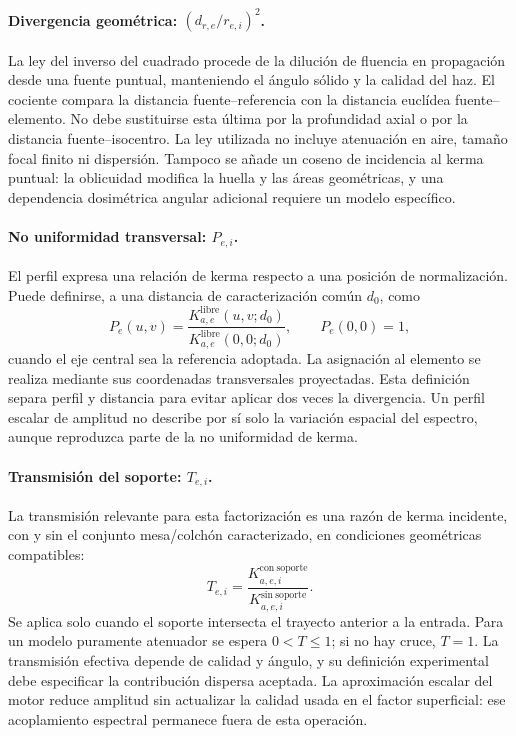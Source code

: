 \paragraph{Divergencia geométrica: $(d_{r,e}/r_{e,i})^2$.}
La ley del inverso del cuadrado procede de la dilución de fluencia en propagación desde una fuente puntual, manteniendo el ángulo sólido y la calidad del haz. El cociente compara la distancia fuente--referencia con la distancia euclídea fuente--elemento. No debe sustituirse esta última por la profundidad axial o por la distancia fuente--isocentro. La ley utilizada no incluye atenuación en aire, tamaño focal finito ni dispersión. Tampoco se añade un coseno de incidencia al kerma puntual: la oblicuidad modifica la huella y las áreas geométricas, y una dependencia dosimétrica angular adicional requiere un modelo específico.

\paragraph{No uniformidad transversal: $P_{e,i}$.}
El perfil expresa una relación de kerma respecto a una posición de normalización. Puede definirse, a una distancia de caracterización común $d_0$, como
\begin{equation}
P_e(u,v)=\frac{K^{\mathrm{libre}}_{a,e}(u,v;d_0)}
{K^{\mathrm{libre}}_{a,e}(0,0;d_0)},
\qquad P_e(0,0)=1,
\end{equation}
cuando el eje central sea la referencia adoptada. La asignación al elemento se realiza mediante sus coordenadas transversales proyectadas. Esta definición separa perfil y distancia para evitar aplicar dos veces la divergencia. Un perfil escalar de amplitud no describe por sí solo la variación espacial del espectro, aunque reproduzca parte de la no uniformidad de kerma.

\paragraph{Transmisión del soporte: $T_{e,i}$.}
La transmisión relevante para esta factorización es una razón de kerma incidente, con y sin el conjunto mesa/colchón caracterizado, en condiciones geométricas compatibles:
\begin{equation}
T_{e,i}=\frac{K^{\mathrm{con\ soporte}}_{a,e,i}}
{K^{\mathrm{sin\ soporte}}_{a,e,i}}.
\end{equation}
Se aplica solo cuando el soporte intersecta el trayecto anterior a la entrada. Para un modelo puramente atenuador se espera $0<T\leq1$; si no hay cruce, $T=1$. La transmisión efectiva depende de calidad y ángulo, y su definición experimental debe especificar la contribución dispersa aceptada. La aproximación escalar del motor reduce amplitud sin actualizar la calidad usada en el factor superficial: ese acoplamiento espectral permanece fuera de esta operación.

